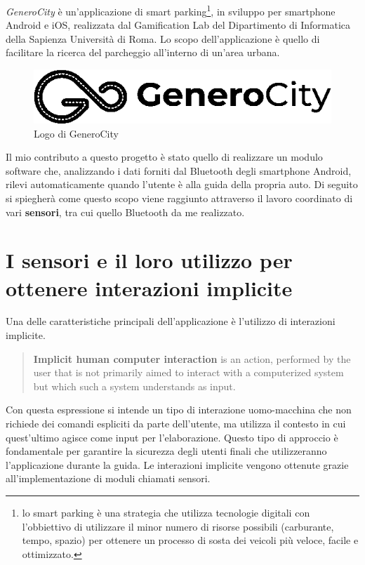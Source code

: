\textit{GeneroCity} è un'applicazione di smart parking\footnote{lo smart parking è una strategia che utilizza tecnologie digitali con l'obbiettivo di utilizzare il minor numero di risorse possibili (carburante, tempo, spazio) per ottenere un processo di sosta dei veicoli più veloce, facile e ottimizzato.\cite{ref:smartparking}}, in sviluppo per smartphone Android e iOS, realizzata dal Gamification Lab del Dipartimento di Informatica della Sapienza Università di Roma. Lo scopo dell'applicazione è quello di facilitare la ricerca del parcheggio all’interno di un’area urbana\cite{ref:generocity}.

\begin{figure}[h]
    \centering
    \vspace*{1\baselineskip}
    \includegraphics[width=0.5\linewidth]{images/gc_logo.png}
    \caption{Logo di GeneroCity}
    \label{fig:gc_logo}
\end{figure}

Il mio contributo a questo progetto è stato quello di realizzare un modulo software che, analizzando i dati forniti dal Bluetooth degli smartphone Android, rilevi automaticamente quando l'utente è alla guida della propria auto. Di seguito si spiegherà come questo scopo viene raggiunto attraverso il lavoro coordinato di vari \textbf{sensori}, tra cui quello Bluetooth da me realizzato.

\section{I sensori e il loro utilizzo per ottenere interazioni implicite}
Una delle caratteristiche principali dell'applicazione è l'utilizzo di interazioni implicite.
\begin{quote}
\textbf{Implicit human computer interaction} is an action,
performed by the user that is not primarily aimed
to interact with a computerized system but which
such a system understands as input.\cite{ref:implicit-interaction}
\end{quote}
Con questa espressione si intende un tipo di interazione uomo-macchina che non richiede dei comandi espliciti da parte dell'utente, ma utilizza il contesto in cui quest'ultimo agisce come input per l'elaborazione\cite{ref:implicit-interaction-2}. Questo tipo di approccio è fondamentale per garantire la sicurezza degli utenti finali che utilizzeranno l'applicazione durante la guida. Le interazioni implicite vengono ottenute grazie all'implementazione di moduli chiamati sensori.

